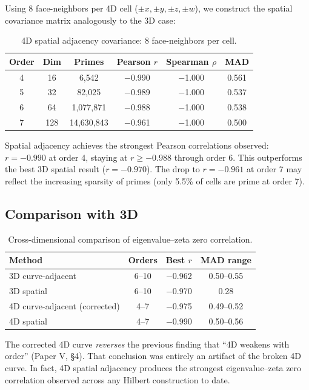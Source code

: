 \documentclass[11pt,a4paper]{article}
\begin{document}
Using 8 face-neighbors per 4D cell ($\pm x, \pm y, \pm z, \pm w$), we
construct the spatial covariance matrix analogously to the 3D case:

\begin{table}[h]
\centering
\begin{tabular}{cccccc}
\toprule
Order & Dim & Primes & Pearson $r$ & Spearman $\rho$ & MAD \\
\midrule
4 & 16 & 6,542 & $-$0.990 & $-$1.000 & 0.561 \\
5 & 32 & 82,025 & $-$0.989 & $-$1.000 & 0.537 \\
6 & 64 & 1,077,871 & $-$0.988 & $-$1.000 & 0.538 \\
7 & 128 & 14,630,843 & $-$0.961 & $-$1.000 & 0.500 \\
\bottomrule
\end{tabular}
\caption{4D spatial adjacency covariance: 8 face-neighbors per cell.}
\end{table}

Spatial adjacency achieves the strongest Pearson correlations observed:
$r = -0.990$ at order 4, staying at $r \geq -0.988$ through order 6.
This outperforms the best 3D spatial result ($r = -0.970$).  The drop to
$r = -0.961$ at order 7 may reflect the increasing sparsity of primes
(only 5.5\% of cells are prime at order 7).

\subsection{Comparison with 3D}

\begin{table}[h]
\centering
\begin{tabular}{lccc}
\toprule
Method & Orders & Best $r$ & MAD range \\
\midrule
3D curve-adjacent & 6--10 & $-$0.962 & 0.50--0.55 \\
3D spatial & 6--10 & $-$0.970 & 0.28 \\
4D curve-adjacent (corrected) & 4--7 & $-$0.975 & 0.49--0.52 \\
4D spatial & 4--7 & $-$0.990 & 0.50--0.56 \\
\bottomrule
\end{tabular}
\caption{Cross-dimensional comparison of eigenvalue--zeta zero correlation.}
\end{table}

The corrected 4D curve \emph{reverses} the previous finding that ``4D
weakens with order'' (Paper V, \S4).  That conclusion was entirely an
artifact of the broken 4D curve.  In fact, 4D spatial adjacency produces
the strongest eigenvalue--zeta zero correlation observed across any
Hilbert construction to date.
\end{document}
